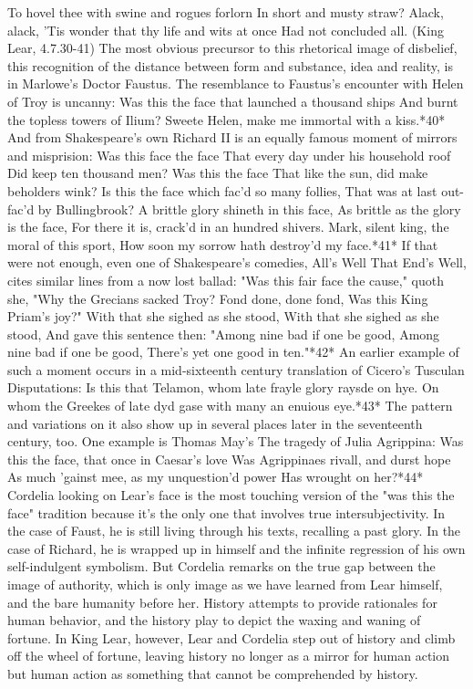To hovel thee with swine and rogues forlorn
In short and musty straw? Alack, alack,
'Tis wonder that thy life and wits at once
Had not concluded all. (King Lear, 4.7.30-41)
The most obvious precursor to this rhetorical image of disbelief, this recognition of the distance between form and substance, idea and reality, is in Marlowe's Doctor Faustus. The resemblance to Faustus's encounter with Helen of Troy is uncanny:
Was this the face that launched a thousand ships
And burnt the topless towers of Ilium?
Sweete Helen, make me immortal with a kiss.*40*
And from Shakespeare's own Richard II is an equally famous moment of mirrors and misprision:
Was this face the face
That every day under his household roof
Did keep ten thousand men? Was this the face
That like the sun, did make beholders wink?
Is this the face which fac'd so many follies,
That was at last out-fac'd by Bullingbrook?
A brittle glory shineth in this face,
As brittle as the glory is the face,
For there it is, crack'd in an hundred shivers.
Mark, silent king, the moral of this sport,
How soon my sorrow hath destroy'd my face.*41*
If that were not enough, even one of Shakespeare's comedies, All's Well That End's Well, cites similar lines from a now lost ballad: 
"Was this fair face the cause," quoth she,
"Why the Grecians sacked Troy?
Fond done, done fond,
Was this King Priam's joy?"
With that she sighed as she stood,
With that she sighed as she stood,
And gave this sentence then:
"Among nine bad if one be good,
Among nine bad if one be good,
There's yet one good in ten."*42*
An earlier example of such a moment occurs in a mid-sixteenth century translation of Cicero's Tusculan Disputations:
Is this that Telamon, whom late frayle glory raysde on hye.
On whom the Greekes of late dyd gase with many an enuious eye.*43*
The pattern and variations on it also show up in several places later in the seventeenth century, too. One example is Thomas May's The tragedy of Julia Agrippina:
Was this the face, that once in Caesar's love
Was Agrippinaes rivall, and durst hope
As much 'gainst mee, as my unquestion'd power
Has wrought on her?*44*
Cordelia looking on Lear's face is the most touching version of the "was this the face" tradition because it's the only one that involves true intersubjectivity. In the case of Faust, he is still living through his texts, recalling a past glory. In the case of Richard, he is wrapped up in himself and the infinite regression of his own self-indulgent symbolism. But Cordelia remarks on the true gap between the image of authority, which is only image as we have learned from Lear himself, and the bare humanity before her. History attempts to provide rationales for human behavior, and the history play to depict the waxing and waning of fortune. In King Lear, however, Lear and Cordelia step out of history and climb off the wheel of fortune, leaving history no longer as a mirror for human action but human action as something that cannot be comprehended by history. 
